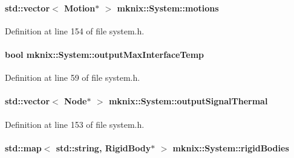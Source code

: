 \paragraph[{motions}]{\setlength{\rightskip}{0pt plus 5cm}std\+::vector$<$ {\bf Motion}$\ast$ $>$ mknix\+::\+System\+::motions\hspace{0.3cm}{\ttfamily [protected]}}\label{classmknix_1_1_system_a5555b9556c466244816bc6654e73d8f6}


Definition at line 154 of file system.\+h.

\hypertarget{classmknix_1_1_system_ab55e1b00bf920164cfe14d0ea9ab08c6}{}
\paragraph[{output\+Max\+Interface\+Temp}]{\setlength{\rightskip}{0pt plus 5cm}bool mknix\+::\+System\+::output\+Max\+Interface\+Temp}\label{classmknix_1_1_system_ab55e1b00bf920164cfe14d0ea9ab08c6}


Definition at line 59 of file system.\+h.

\hypertarget{classmknix_1_1_system_a7e1b0adf59579754f0863b3fd9864b21}{}
\paragraph[{output\+Signal\+Thermal}]{\setlength{\rightskip}{0pt plus 5cm}std\+::vector$<$ {\bf Node}$\ast$ $>$ mknix\+::\+System\+::output\+Signal\+Thermal\hspace{0.3cm}{\ttfamily [protected]}}\label{classmknix_1_1_system_a7e1b0adf59579754f0863b3fd9864b21}


Definition at line 153 of file system.\+h.

\hypertarget{classmknix_1_1_system_ac39f69fd16a8c74a79dc3258e4f9c505}{}
\paragraph[{rigid\+Bodies}]{\setlength{\rightskip}{0pt plus 5cm}std\+::map$<$ std\+::string, {\bf Rigid\+Body}$\ast$ $>$ mknix\+::\+System\+::rigid\+Bodies\hspace{0.3cm}{\ttfamily [protected]}}\label{classmknix_1_1_system_ac39f69fd16a8c74a79dc3258e4f9c505}


